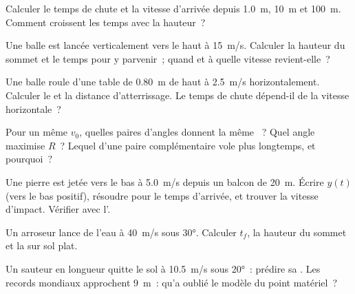 \begin{exercise}[$\star$]\label{exo:g12:projectile-motion:3}
Calculer le temps de chute et la vitesse d'arrivée depuis
\qty{1.0}{m}, \qty{10}{m} et \qty{100}{m}. Comment croissent les temps
avec la hauteur~?
\end{exercise}

\begin{exercise}[$\star$]\label{exo:g12:projectile-motion:4}
Une balle est lancée verticalement vers le haut à \qty{15}{m/s}.
Calculer la hauteur du sommet et le temps pour y parvenir~; quand et
à quelle vitesse revient-elle~?
\end{exercise}

\begin{exercise}[$\star$]\label{exo:g12:projectile-motion:5}
Une balle roule d'une table de \qty{0.80}{m} de haut à \qty{2.5}{m/s}
horizontalement. Calculer le  et la distance d'atterrissage.
Le temps de chute dépend-il de la vitesse horizontale~?
\end{exercise}

\begin{exercise}[$\star\star$]\label{exo:g12:projectile-motion:6}
Pour un même $v_0$, quelles paires d'angles donnent la même
~? Quel angle maximise $R$~? Lequel d'une paire
complémentaire vole plus longtemps, et pourquoi~?
\end{exercise}

\begin{exercise}[$\star\star$]\label{exo:g12:projectile-motion:7}
Une pierre est jetée vers le bas à \qty{5.0}{m/s} depuis un balcon de
\qty{20}{m}. Écrire $y(t)$ (vers le bas positif), résoudre pour le
temps d'arrivée, et trouver la vitesse d'impact. Vérifier avec
l'.
\end{exercise}

\begin{exercise}[$\star\star$]\label{exo:g12:projectile-motion:8}
Un arroseur lance de l'eau à \qty{40}{m/s} sous \ang{30}. Calculer
$t_f$, la hauteur du sommet et la  sur sol plat.
\end{exercise}

\begin{exercise}[$\star\star$]\label{exo:g12:projectile-motion:9}
Un sauteur en longueur quitte le sol à \qty{10.5}{m/s} sous
\ang{20}~: prédire sa . Les records mondiaux
approchent \qty{9}{m}~: qu'a oublié le modèle du point matériel~?
\end{exercise}

